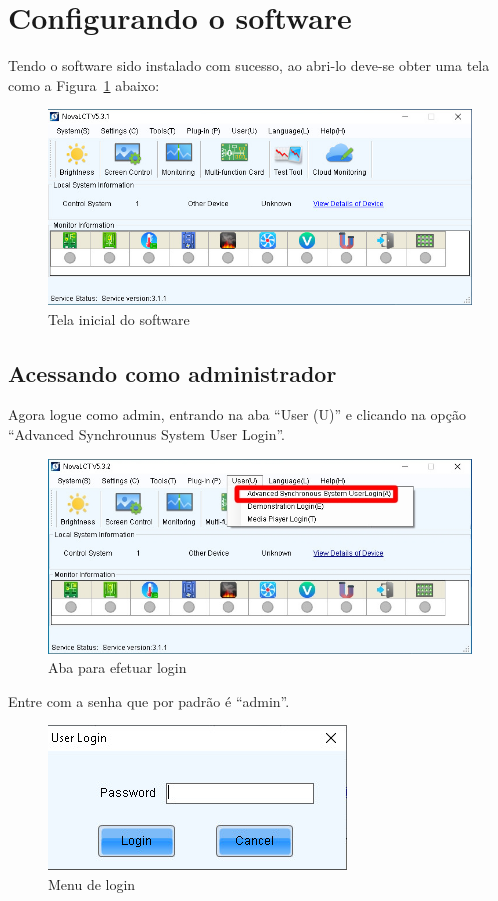 \documentclass[12pt, a4paper]{article}
\begin{document}
\section{Configurando o software}\label{Configurando o software}
Tendo o software sido instalado com sucesso, ao abri-lo deve-se obter uma tela como a Figura~\ref{fig:CS1.jpeg} abaixo:
\begin{figure}[!htb]
	\centering
	\includegraphics[width=\textwidth]{CS1.jpeg}
	\caption{\label{fig:CS1.jpeg}Tela inicial do software}
\end{figure}

\subsection{Acessando como administrador}\label{Acessando como administrador}
Agora logue como admin, entrando na aba ``User (U)'' e clicando na opção ``Advanced Synchrounus System User Login''.
\begin{figure}[!htb]
	\centering
	\includegraphics[width=\textwidth]{CS2.jpeg}
	\caption{\label{fig:CS2.jpeg}Aba para efetuar login}
\end{figure}

\newpage
Entre com a senha que por padrão é ``admin''.
\begin{figure}[!htb]
	\centering
	\includegraphics[width=.6\textwidth]{CS3.jpeg}
	\caption{\label{fig:CS3.jpeg}Menu de login}
\end{figure}
\end{document}
